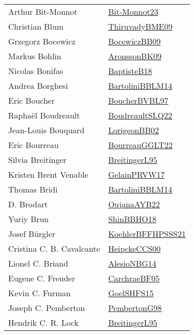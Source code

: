 {\begin{longtable}{p{4cm}p{20cm}}
Arthur Bit{-}Monnot & \href{papers/Bit-Monnot23.pdf}{Bit-Monnot23}\cite{Bit-Monnot23} \\
Christian Blum & \href{papers/ThiruvadyBME09.pdf}{ThiruvadyBME09}\cite{ThiruvadyBME09} \\
Grzegorz Bocewicz & \href{}{BocewiczBB09}\cite{BocewiczBB09} \\
Markus Bohlin & \href{papers/AronssonBK09.pdf}{AronssonBK09}\cite{AronssonBK09} \\
Nicolas Bonifas & \href{articles/BaptisteB18.pdf}{BaptisteB18}\cite{BaptisteB18} \\
Andrea Borghesi & \href{papers/BartoliniBBLM14.pdf}{BartoliniBBLM14}\cite{BartoliniBBLM14} \\
Eric Boucher & \href{}{BoucherBVBL97}\cite{BoucherBVBL97} \\
Rapha{\"{e}}l Boudreault & \href{papers/BoudreaultSLQ22.pdf}{BoudreaultSLQ22}\cite{BoudreaultSLQ22} \\
Jean{-}Louis Bouquard & \href{}{LorigeonBB02}\cite{LorigeonBB02} \\
Eric Bourreau & \href{}{BourreauGGLT22}\cite{BourreauGGLT22} \\
Silvia Breitinger & \href{}{BreitingerL95}\cite{BreitingerL95} \\
Kristen Brent Venable & \href{papers/GelainPRVW17.pdf}{GelainPRVW17}\cite{GelainPRVW17} \\
Thomas Bridi & \href{papers/BartoliniBBLM14.pdf}{BartoliniBBLM14}\cite{BartoliniBBLM14} \\
D. Brodart & \href{papers/OujanaAYB22.pdf}{OujanaAYB22}\cite{OujanaAYB22} \\
Yuriy Brun & \href{articles/ShinBBHO18.pdf}{ShinBBHO18}\cite{ShinBBHO18} \\
Josef B{\"{u}}rgler & \href{articles/KoehlerBFFHPSSS21.pdf}{KoehlerBFFHPSSS21}\cite{KoehlerBFFHPSSS21} \\
Cristina C. B. Cavalcante & \href{articles/HeipckeCCS00.pdf}{HeipckeCCS00}\cite{HeipckeCCS00} \\
Lionel C. Briand & \href{papers/AlesioNBG14.pdf}{AlesioNBG14}\cite{AlesioNBG14} \\
Eugene C. Freuder & \href{papers/CarchraeBF05.pdf}{CarchraeBF05}\cite{CarchraeBF05} \\
Kevin C. Furman & \href{articles/GoelSHFS15.pdf}{GoelSHFS15}\cite{GoelSHFS15} \\
Joseph C. Pemberton & \href{}{PembertonG98}\cite{PembertonG98} \\
Hendrik C. R. Lock & \href{}{BreitingerL95}\cite{BreitingerL95} \\

\end{longtable}}
